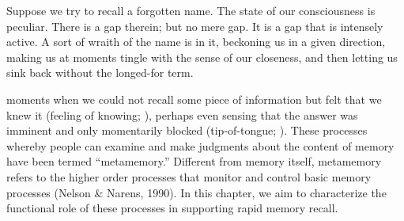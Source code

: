 \begin{savequote}[75mm]
Suppose we try to recall a forgotten name. The state of our consciousness is peculiar. There is a gap therein; but no mere gap. It is a gap that is intensely active. A sort of wraith of the name is in it, beckoning us in a given direction, making us at moments tingle with the sense of our closeness, and then letting us sink back without the longed-for term.
\end{savequote}





\label{sec:memory}



\newcommand{\citepnelson}{(Nelson \& Narens, 1990)}
\newcommand{\citetnelson}{Nelson \& Narens (1990)}
\newcommand{\citealpnelson}{Nelson \& Narens, 1990}
\nocite{nelson1990metamemory}

 moments when we could not recall some piece of information but felt that we knew it (feeling of knowing; \citealp{hart1965memory}), perhaps even sensing that the answer was imminent and only momentarily blocked (tip-of-tongue; \citealp{brown1966tip}). These processes whereby people can examine and make judgments about the content of memory have been termed ``metamemory.'' Different from memory itself, metamemory refers to the higher order processes that monitor and control basic memory processes \citepnelson{}. In this chapter, we aim to characterize the functional role of these processes in supporting rapid memory recall.

